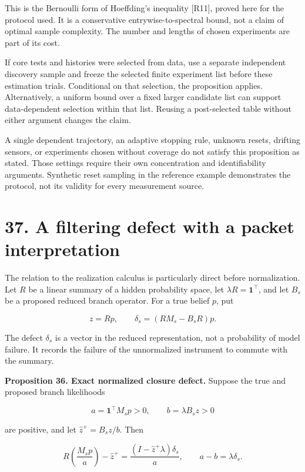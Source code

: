 \documentclass[11pt,letterpaper]{article}
\begin{document}
This is the Bernoulli form of Hoeffding's inequality {[}R11{]}, proved
here for the protocol used. It is a conservative entrywise-to-spectral
bound, not a claim of optimal sample complexity. The number and lengths
of chosen experiments are part of its cost.

If core tests and histories were selected from data, use a separate
independent discovery sample and freeze the selected finite experiment
list before these estimation trials. Conditional on that selection, the
proposition applies. Alternatively, a uniform bound over a fixed larger
candidate list can support data-dependent selection within that list.
Reusing a post-selected table without either argument changes the claim.

A single dependent trajectory, an adaptive stopping rule, unknown
resets, drifting sensors, or experiments chosen without coverage do not
satisfy this proposition as stated. Those settings require their own
concentration and identifiability arguments. Synthetic reset sampling in
the reference example demonstrates the protocol, not its validity for
every measurement source.

\section{37. A filtering defect with a packet
interpretation}\label{a-filtering-defect-with-a-packet-interpretation}

The relation to the realization calculus is particularly direct before
normalization. Let \(R\) be a linear summary of a hidden probability
space, let \(\lambda R=\mathbf1^\top\), and let \(B_s\) be a proposed
reduced branch operator. For a true belief \(p\), put

\[
z=Rp,\qquad
\delta_s=(RM_s-B_sR)p.
\]

The defect \(\delta_s\) is a vector in the reduced representation, not a
probability of model failure. It records the failure of the unnormalized
instrument to commute with the summary.

\textbf{Proposition 36. Exact normalized closure defect.} Suppose the
true and proposed branch likelihoods

\[
a=\mathbf1^\top M_sp>0,\qquad
b=\lambda B_sz>0
\]

are positive, and let \(\widehat z^+=B_sz/b\). Then

\[
\boxed{
R\left(\frac{M_sp}{a}\right)-\widehat z^+
=\frac{(I-\widehat z^+\lambda)\delta_s}{a},
\qquad a-b=\lambda\delta_s.
}
\]
\end{document}
